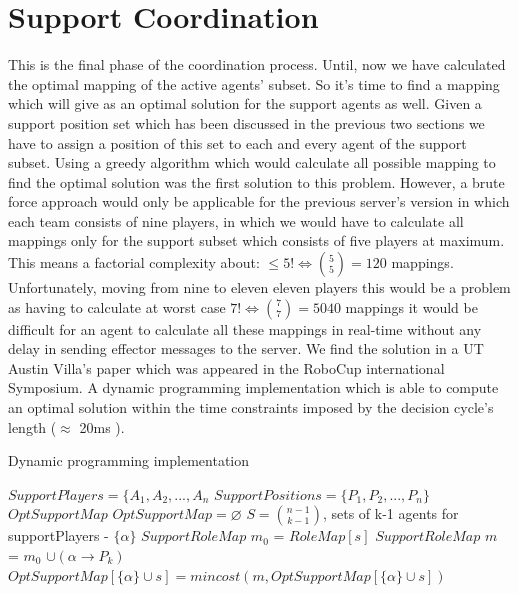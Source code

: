 \section{Support Coordination}
This is the final phase of the coordination process. Until, now we have calculated the optimal mapping of the active agents' subset. So it's time to find a mapping which will give as an optimal solution for the support agents as well. Given a support position set which has been discussed in the previous two sections we have to assign a position of this set to each and every agent of the support subset. Using a greedy algorithm which would calculate all possible mapping to find the optimal solution was the first solution to this problem. However, a brute force approach would only be applicable for the previous server's version in which each team consists of nine players, in which we would have to calculate all mappings only for the support subset which consists of five players at maximum. This means a factorial complexity about: $\leqslant 5! \Leftrightarrow  {{5}\choose{5}} = 120$ mappings. Unfortunately, moving from nine to eleven eleven players this would be a problem as having to calculate at worst case $ 7! \Leftrightarrow  {{7}\choose{7}} = 5040$ mappings it would be difficult for an agent to calculate all these mappings in real-time without any delay in sending effector messages to the server. We find the solution in a UT Austin Villa's paper which was appeared in the RoboCup international Symposium. A dynamic programming implementation which is able to compute an optimal solution within the time constraints imposed by the decision cycle's length ($\approx$ 20ms ).
\begin{algorithm}[htb!]
\caption{Dynamic programming implementation}
\label{alg3}
\begin{algorithmic}[1]
$SupportPlayers = \lbrace A_{1},A_{2},...,A_{n} $
\STATE $SupportPositions = \lbrace P_{1},P_{2},...,P_{n} \rbrace $
$OptSupportMap$
\STATE $OptSupportMap = \varnothing $
\STATE $ S = {{n-1}\choose{k-1}} $, sets of k-1 agents for supportPlayers - $\lbrace \alpha \rbrace$
\STATE $SupportRoleMap$ $m_{0}$ = $RoleMap[s]$
\STATE $SupportRoleMap$ $m$ = $m_{0}$ $ \cup (\alpha \rightarrow P_{k})$
\STATE $OptSupportMap[\lbrace \alpha \rbrace \cup s] = mincost(m,OptSupportMap[\lbrace \alpha \rbrace \cup s])$
\ENDFOR
\ENDFOR
\ENDFOR
\end{algorithmic}
\end{algorithm}

